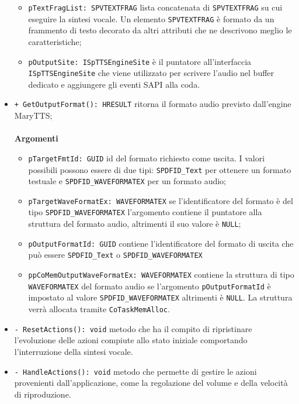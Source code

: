 \begin{itemize}
\begin{itemize}
		\item \texttt{pTextFragList: SPVTEXTFRAG} lista concatenata di \texttt{SPVTEXTFRAG} su cui eseguire la sintesi vocale. Un elemento \texttt{SPVTEXTFRAG} è formato da un frammento di testo decorato da altri attributi che ne descrivono meglio le caratteristiche;
		\item \texttt{pOutputSite: ISpTTSEngineSite} è il puntatore all'interfaccia\\\texttt{ISpTTSEngineSite} che viene utilizzato per scrivere l'audio nel buffer dedicato e aggiungere gli eventi SAPI alla coda.
	\end{itemize}
	\item \texttt{+ GetOutputFormat(): HRESULT} ritorna il formato audio previsto dall'engine MaryTTS;
	\\\\
	\textbf{Argomenti}
	\begin{itemize}
		\item \texttt{pTargetFmtId: GUID} id del formato richiesto come uscita. I valori possibili possono essere di due tipi: \texttt{SPDFID\_Text} per ottenere un formato testuale e \texttt{SPDFID\_WAVEFORMATEX} per un formato audio;
		\item \texttt{pTargetWaveFormatEx: WAVEFORMATEX} se l'identificatore del formato è del tipo \texttt{SPDFID\_WAVEFORMATEX} l'argomento contiene il puntatore alla struttura del formato audio, altrimenti il suo valore è \texttt{NULL};
		\item \texttt{pOutputFormatId: GUID} contiene l'identificatore del formato di uscita che può essere \texttt{SPDFID\_Text} o \texttt{SPDFID\_WAVEFORMATEX}
		\item \texttt{ppCoMemOutputWaveFormatEx: WAVEFORMATEX} contiene la struttura di tipo \texttt{WAVEFORMATEX} del formato audio se l'argomento \texttt{pOutputFormatId} è impostato al valore \texttt{SPDFID\_WAVEFORMATEX} altrimenti è \texttt{NULL}. La struttura verrà allocata tramite \texttt{CoTaskMemAlloc}.
	\end{itemize}
	\item \texttt{- ResetActions(): void} metodo che ha il compito di ripristinare l'evoluzione delle azioni compiute allo stato iniziale comportando l'interruzione della sintesi vocale.
	\item \texttt{- HandleActions(): void} metodo che permette di gestire le azioni provenienti dall'applicazione, come la regolazione del volume e della velocità di riproduzione.
	\\\\

\end{itemize}
